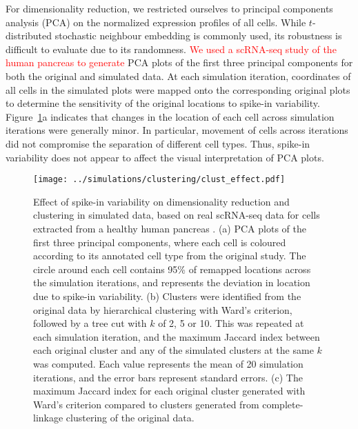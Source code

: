 \documentclass{article}
\newcommand{\revised}[1]{\textcolor{red}{#1}}
\begin{document}
For dimensionality reduction, we restricted ourselves to principal components analysis (PCA) on the normalized expression profiles of all cells. 
While $t$-distributed stochastic neighbour embedding \autocite{van2008visualizing} is commonly used, its robustness is difficult to evaluate due to its randomness.
\revised{We used a scRNA-seq study of the human pancreas \autocite{segerstople2016single} to generate} PCA plots of the first three principal components for both the original and simulated data.
At each simulation iteration, coordinates of all cells in the simulated plots were mapped onto the corresponding original plots to determine the sensitivity of the original locations to spike-in variability.
Figure~\ref{fig:dimclust}a indicates that changes in the location of each cell across simulation iterations were generally minor.
In particular, movement of cells across iterations did not compromise the separation of different cell types. 
Thus, spike-in variability does not appear to affect the visual interpretation of PCA plots.

\begin{figure}[btp]
    \begin{center}
        \texttt{[image: ../simulations/clustering/clust\_effect.pdf]}
    \end{center}
    \caption{Effect of spike-in variability on dimensionality reduction and clustering in simulated data,
        based on real scRNA-seq data for cells extracted from a healthy human pancreas \autocite{segerstople2016single}.
        (a) PCA plots of the first three principal components, where each cell is coloured according to its annotated cell type from the original study. 
        The circle around each cell contains 95\% of remapped locations across the simulation iterations, and represents the deviation in location due to spike-in variability.
        (b) Clusters were identified from the original data by hierarchical clustering with Ward's criterion, followed by a tree cut with $k$ of 2, 5 or 10.
        This was repeated at each simulation iteration, and the maximum Jaccard index between each original cluster and any of the simulated clusters at the same $k$ was computed.
        Each value represents the mean of 20 simulation iterations, and the error bars represent standard errors.
        (c) The maximum Jaccard index for each original cluster generated with Ward's criterion compared to clusters generated from complete-linkage clustering of the original data.
    }
    \label{fig:dimclust}
\end{figure}
\end{document}
